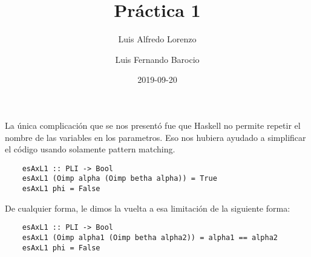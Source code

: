 \documentclass{article}
\title{Práctica 1}
\date{2019-09-20}
\author{
  Luis Alfredo Lorenzo
  \and
  Luis Fernando Barocio
}
\begin{document}
  \maketitle

  La única complicación que se nos presentó fue que Haskell no permite 
  repetir el nombre de las variables en los parametros. Eso nos hubiera
  ayudado a simplificar el código usando solamente pattern matching.

  \begin{verbatim}
    esAxL1 :: PLI -> Bool
    esAxL1 (Oimp alpha (Oimp betha alpha)) = True 
    esAxL1 phi = False
  \end{verbatim}

  De cualquier forma, le dimos la vuelta a esa limitación de la siguiente forma:

  \begin{verbatim}
    esAxL1 :: PLI -> Bool
    esAxL1 (Oimp alpha1 (Oimp betha alpha2)) = alpha1 == alpha2
    esAxL1 phi = False
  \end{verbatim}
\end{document}
